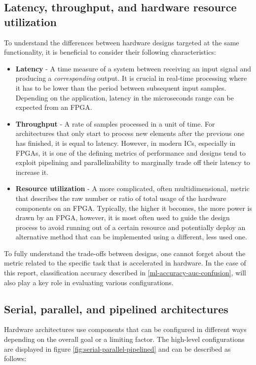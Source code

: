 \subsection{Latency, throughput, and hardware resource utilization}\label{latency-throughput-resources}
To understand the differences between hardware designs targeted at the same functionality, it is beneficial to consider their following characteristics:

\begin{itemize}
  \item \textbf{Latency} - A time measure of a system between receiving an input signal and producing a \textit{corresponding} output. It is crucial in real-time processing where it has to be lower than the period between subsequent input samples. Depending on the application, latency in the microseconds range can be expected from an FPGA.
  \item \textbf{Throughput} - A rate of samples processed in a unit of time. For architectures that only start to process new elements after the previous one has finished, it is equal to latency. However, in modern ICs, especially in FPGAs, it is one of the defining metrics of performance and designs tend to exploit pipelining and parallelizability to marginally trade off their latency to increase it.
  \item \textbf{Resource utilization} - A more complicated, often multidimensional, metric that describes the raw number or ratio of total usage of the hardware components on an FPGA. Typically, the higher it becomes, the more power is drawn by an FPGA, however, it is most often used to guide the design process to avoid running out of a certain resource and potentially deploy an alternative method that can be implemented using a different, less used one.
\end{itemize}

To fully understand the trade-offs between designs, one cannot forget about the metric related to the specific task that is accelerated in hardware. In the case of this report, classification accuracy described in \autoref{ml-accuracy-auc-confusion}, will also play a key role in evaluating various configurations.


\subsection{Serial, parallel, and pipelined architectures}
Hardware architectures use components that can be configured in different ways depending on the overall goal or a limiting factor. The high-level configurations  are displayed in figure \ref{fig:serial-parallel-pipelined} and can be described as follows:

